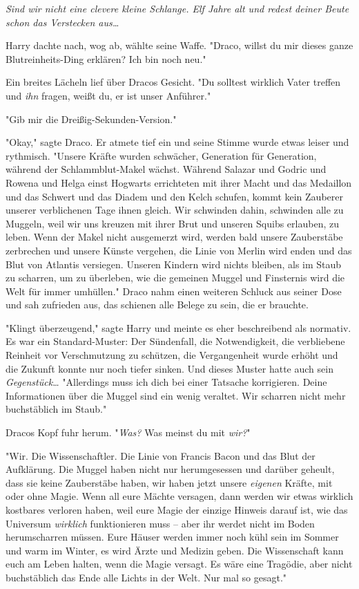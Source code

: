 {\emph{Sind wir nicht eine clevere kleine Schlange. Elf Jahre alt und redest deiner Beute schon das Verstecken aus…}

Harry dachte nach, wog ab, wählte seine Waffe. "Draco, willst du mir dieses ganze Blutreinheits-Ding erklären? Ich bin noch neu."

Ein breites Lächeln lief über Dracos Gesicht. "Du solltest wirklich Vater treffen und \emph{ihn} fragen, weißt du, er ist unser Anführer."

"Gib mir die Dreißig-Sekunden-Version."

"Okay," sagte Draco. Er atmete tief ein und seine Stimme wurde etwas leiser und rythmisch. "Unsere Kräfte wurden schwächer, Generation für Generation, während der Schlammblut-Makel wächst. Während Salazar und Godric und Rowena und Helga einst Hogwarts errichteten mit ihrer Macht und das Medaillon und das Schwert und das Diadem und den Kelch schufen, kommt kein Zauberer unserer verblichenen Tage ihnen gleich. Wir schwinden dahin, schwinden alle zu Muggeln, weil wir uns kreuzen mit ihrer Brut und unseren Squibs erlauben, zu leben. Wenn der Makel nicht ausgemerzt wird, werden bald unsere Zauberstäbe zerbrechen und unsere Künste vergehen, die Linie von Merlin wird enden und das Blut von Atlantis versiegen. Unseren Kindern wird nichts bleiben, als im Staub zu scharren, um zu überleben, wie die gemeinen Muggel und Finsternis wird die Welt für immer umhüllen." Draco nahm einen weiteren Schluck aus seiner Dose und sah zufrieden aus, das schienen alle Belege zu sein, die er brauchte.

"Klingt überzeugend," sagte Harry und meinte es eher beschreibend als normativ. Es war ein Standard-Muster: Der Sündenfall, die Notwendigkeit, die verbliebene Reinheit vor Verschmutzung zu schützen, die Vergangenheit wurde erhöht und die Zukunft konnte nur noch tiefer sinken. Und dieses Muster hatte auch sein \emph{Gegenstück…} "Allerdings muss ich dich bei einer Tatsache korrigieren. Deine Informationen über die Muggel sind ein wenig veraltet. Wir scharren nicht mehr buchstäblich im Staub."

Dracos Kopf fuhr herum. "\emph{Was?} Was meinst du mit \emph{wir?}"

"Wir. Die Wissenschaftler. Die Linie von Francis Bacon und das Blut der Aufklärung. Die Muggel haben nicht nur herumgesessen und darüber geheult, dass sie keine Zauberstäbe haben, wir haben jetzt unsere \emph{eigenen} Kräfte, mit oder ohne Magie. Wenn all eure Mächte versagen, dann werden wir etwas wirklich kostbares verloren haben, weil eure Magie der einzige Hinweis darauf ist, wie das Universum \emph{wirklich} funktionieren muss -- aber ihr werdet nicht im Boden herumscharren müssen. Eure Häuser werden immer noch kühl sein im Sommer und warm im Winter, es wird Ärzte und Medizin geben. Die Wissenschaft kann euch am Leben halten, wenn die Magie versagt. Es wäre eine Tragödie, aber nicht buchstäblich das Ende alle Lichts in der Welt. Nur mal so gesagt."

}
